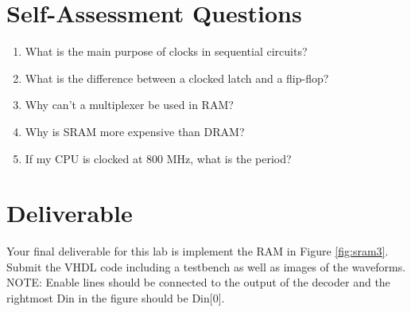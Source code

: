 \documentclass[a4paper, 11pt,oneside]{article}
\begin{document}
\section{Self-Assessment Questions}
\begin{enumerate}
\item What is the main purpose of clocks in sequential circuits?
\item What is the difference between a clocked latch and a flip-flop?
\item Why can't a multiplexer be used in RAM?
\item Why is SRAM more expensive than DRAM?
\item If my CPU is clocked at 800 MHz, what is the period?
\end{enumerate}

\section{Deliverable}
Your final deliverable for this lab is implement the RAM in Figure 
 \ref{fig:sram3}. Submit the VHDL code including a testbench as well as images 
of the waveforms. NOTE: Enable lines should be connected to the output of the 
decoder and the rightmost Din in the figure should be Din[0].





\nocite{*}
\end{document}

